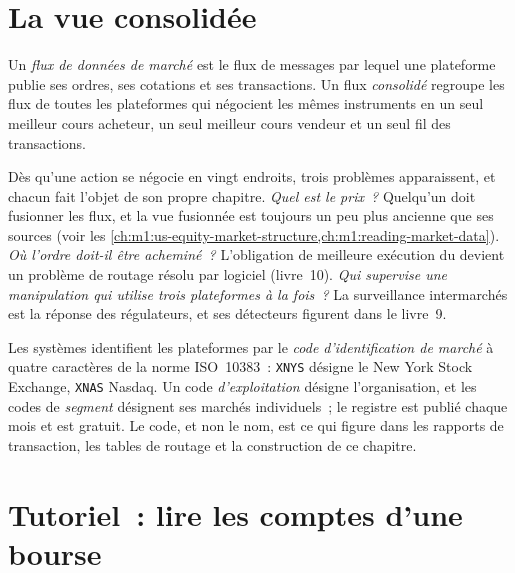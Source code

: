 \section{La vue consolidée}

\begin{definition}\label{def:m1:exchanges-brokers-venues:feed}
Un \emph{flux de données de marché} est le flux de messages
par lequel une plateforme publie ses ordres, ses cotations et ses transactions. Un flux
\emph{consolidé} regroupe les flux de toutes les plateformes qui négocient les mêmes
instruments en un seul meilleur cours acheteur, un seul meilleur cours vendeur et un seul fil des transactions.
\end{definition}

Dès qu'une action se négocie en vingt endroits, trois problèmes apparaissent, et chacun
fait l'objet de son propre chapitre. \emph{Quel est le prix~?} Quelqu'un doit fusionner les
flux, et la vue fusionnée est toujours un peu plus ancienne que ses sources
(voir les \cref{ch:m1:us-equity-market-structure,ch:m1:reading-market-data}).
\emph{Où l'ordre doit-il être acheminé~?} L'obligation de meilleure exécution du  devient un
problème de routage résolu par logiciel (livre~10). \emph{Qui supervise
une manipulation qui utilise trois plateformes à la fois~?} La surveillance intermarchés est
la réponse des régulateurs, et ses détecteurs figurent dans le livre~9.

\begin{remark}\label{rem:m1:exchanges-brokers-venues:mic}
Les systèmes identifient les plateformes par le \emph{code d'identification de marché} à quatre caractères
de la norme ISO~10383~: \texttt{XNYS} désigne le New York Stock Exchange, \texttt{XNAS}
Nasdaq. Un code \emph{d'exploitation} désigne l'organisation, et les codes de \emph{segment}
désignent ses marchés individuels~; le registre est publié chaque mois et est
gratuit. Le code, et non le nom, est ce qui figure dans les rapports de transaction, les
tables de routage et la construction de ce chapitre.
\end{remark}

\section{Tutoriel~: lire les comptes d'une bourse}\label{tut:m1:exchanges-brokers-venues:accounts}

